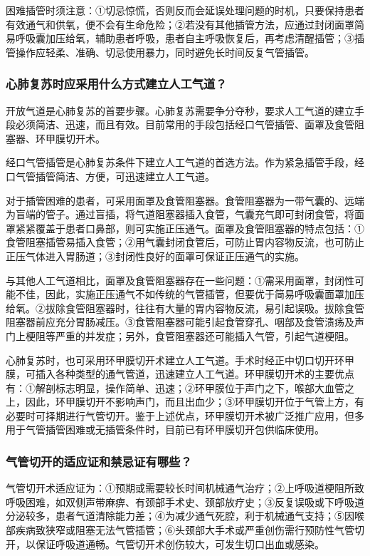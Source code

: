困难插管时须注意：①切忌惊慌，否则反而会延误处理问题的时机，只要保持患者有效通气和供氧，便不会有生命危险；②若没有其他插管方法，应通过封闭面罩简易呼吸囊加压给氧，辅助患者呼吸，患者自主呼吸恢复后，再考虑清醒插管；③插管操作应轻柔、准确、切忌使用暴力，同时避免长时间反复气管插管。

\subsubsection{心肺复苏时应采用什么方式建立人工气道？}

开放气道是心肺复苏的首要步骤。心肺复苏需要争分夺秒，要求人工气道的建立手段必须简洁、迅速，而且有效。目前常用的手段包括经口气管插管、面罩及食管阻塞器、环甲膜切开术。

经口气管插管是心肺复苏条件下建立人工气道的首选方法。作为紧急插管手段，经口气管插管简洁、方便，可迅速建立人工气道。

对于插管困难的患者，可采用面罩及食管阻塞器。食管阻塞器为一带气囊的、远端为盲端的管子。通过盲插，将气道阻塞器插入食管，气囊充气即可封闭食管，将面罩紧紧覆盖于患者口鼻部，则可实施正压通气。面罩及食管阻塞器的特点包括：①食管阻塞插管易插入食管；②用气囊封闭食管后，可防止胃内容物反流，也可防止正压气体进入胃肠道；③封闭性良好的面罩可保证正压通气的实施。

与其他人工气道相比，面罩及食管阻塞器存在一些问题：①需采用面罩，封闭性可能不佳，因此，实施正压通气不如传统的气管插管，但要优于简易呼吸囊面罩加压给氧。②拔除食管阻塞器时，往往有大量的胃内容物反流，易引起误吸。拔除食管阻塞器前应充分胃肠减压。③食管阻塞器可能引起食管穿孔、咽部及食管溃疡及声门上梗阻等严重的并发症；另外，食管阻塞器还可能插入气管，引起气道梗阻。

心肺复苏时，也可采用环甲膜切开术建立人工气道。手术时经正中切口切开环甲膜，可插入各种类型的通气管道，迅速建立人工气道。环甲膜切开术的主要优点有：①解剖标志明显，操作简单、迅速；②环甲膜位于声门之下，喉部大血管之上，因此，环甲膜切开不影响声门，而且出血少；③环甲膜切开位于气管上方，有必要时可择期进行气管切开。鉴于上述优点，环甲膜切开术被广泛推广应用，但多用于气管插管困难或无插管条件时，目前已有环甲膜切开包供临床使用。

\subsubsection{气管切开的适应证和禁忌证有哪些？}

气管切开术适应证为：①预期或需要较长时间机械通气治疗；②上呼吸道梗阻所致呼吸困难，如双侧声带麻痹、有颈部手术史、颈部放疗史；③反复误吸或下呼吸道分泌较多，患者气道清除能力差；④为减少通气死腔，利于机械通气支持；⑤因喉部疾病致狭窄或阻塞无法气管插管；⑥头颈部大手术或严重创伤需行预防性气管切开，以保证呼吸道通畅。气管切开术创伤较大，可发生切口出血或感染。

